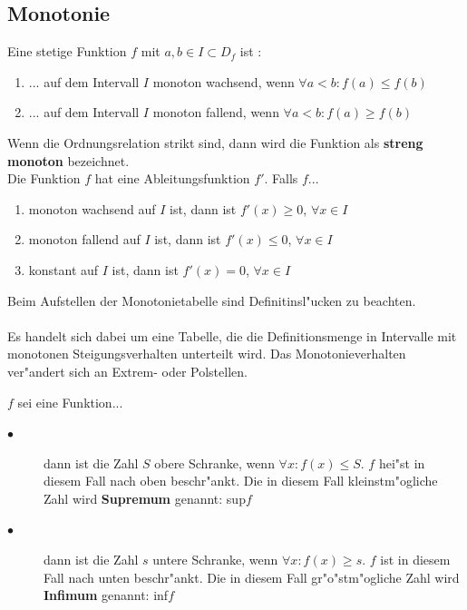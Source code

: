 \subsection{Monotonie}

\begin{Definition}
Eine stetige Funktion $f$ mit $a,b\in I \subset D_{f}$ ist :\\
\begin{enumerate}
\item ... auf dem Intervall $I$ monoton wachsend, wenn $\forall a < b: f(a)\leq f(b)$
\item ... auf dem Intervall $I$ monoton fallend, wenn $\forall a < b: f(a) \geq f(b)$ \\
\end{enumerate}
Wenn die Ordnungsrelation strikt sind, dann wird die Funktion als \textbf{streng monoton} bezeichnet.\\
Die Funktion $f$ hat eine Ableitungsfunktion $f'$. Falls $f$...
\begin{enumerate}
\item monoton wachsend auf $I$ ist, dann ist $f'(x)\geq0$, \quad $\forall x \in I$
\item monoton fallend auf $I$ ist, dann ist $f'(x)\leq0$, \quad $\forall x \in I$
\item konstant auf $I$ ist, dann ist $f'(x)=0$, \quad $\forall x \in I$
\end{enumerate}
Beim Aufstellen der Monotonietabelle sind Definitinsl"ucken zu beachten.\\
\\
Es handelt sich dabei um eine Tabelle, die die Definitionsmenge in Intervalle mit monotonen Steigungsverhalten unterteilt wird. Das Monotonieverhalten ver"andert sich an Extrem- oder Polstellen.\\
\end{Definition}
\begin{Bemerkung}
$f$ sei eine Funktion...
\begin{description}
\item[$\bullet$] dann ist die Zahl $S$ obere Schranke, wenn $\forall x : f(x)\leq S$. $f$ hei"st in diesem Fall nach oben beschr"ankt. Die in diesem Fall kleinstm"ogliche Zahl wird \textbf{Supremum} genannt: sup$f$
\item[$\bullet$] dann ist die Zahl $s$ untere Schranke, wenn $\forall x : f(x) \geq s$. $f$ ist in diesem Fall nach unten beschr"ankt. Die in diesem Fall gr"o"stm"ogliche Zahl wird \textbf{Infimum} genannt: inf$f$
\end{description}
\end{Bemerkung}

